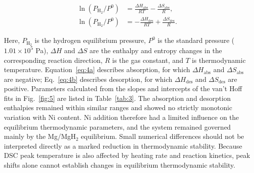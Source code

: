 \documentclass[preprint,12pt]{elsarticle}
\begin{document}
\begin{subequations}\label{eq:4}
\begin{align}
\ln(P_{\mathrm{H}_2}/P^0) &= \frac{\Delta H_{\mathrm{abs}}}{RT}-\frac{\Delta S_{\mathrm{abs}}}{R}, \label{eq:4a}\\
\ln(P_{\mathrm{H}_2}/P^0) &= -\frac{\Delta H_{\mathrm{des}}}{RT}+\frac{\Delta S_{\mathrm{des}}}{R}. \label{eq:4b}
\end{align}
\end{subequations}

Here, $P_{\mathrm{H}_2}$ is the hydrogen equilibrium pressure, $P^0$ is the standard pressure ($1.01\times10^5$ Pa), $\Delta H$ and $\Delta S$ are the enthalpy and entropy changes in the corresponding reaction direction, $R$ is the gas constant, and $T$ is thermodynamic temperature. Equation~\eqref{eq:4a} describes absorption, for which $\Delta H_{\mathrm{abs}}$ and $\Delta S_{\mathrm{abs}}$ are negative; Eq.~\eqref{eq:4b} describes desorption, for which $\Delta H_{\mathrm{des}}$ and $\Delta S_{\mathrm{des}}$ are positive. Parameters calculated from the slopes and intercepts of the van't Hoff fits in Fig.~\ref{fig:5} are listed in Table~\ref{tab:3}. The absorption and desorption enthalpies remained within similar ranges and showed no strictly monotonic variation with Ni content. Ni addition therefore had a limited influence on the equilibrium thermodynamic parameters, and the system remained governed mainly by the Mg/MgH$_2$ equilibrium. Small numerical differences should not be interpreted directly as a marked reduction in thermodynamic stability. Because DSC peak temperature is also affected by heating rate and reaction kinetics, peak shifts alone cannot establish changes in equilibrium thermodynamic stability.
\end{document}
